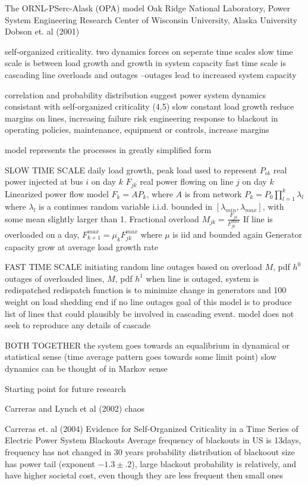 The ORNL-PSerc-Alask (OPA) model    
Oak Ridge National Laboratory, Power System Engineering Research Center of Wisconsin University, Alaska University
Dobson et. al (2001) \cite{dobson_2001}

self-organized criticality.  two dynamics forces on seperate time scales
slow time scale is between load growth and growth in system capacity
fast time scale is cascading line overloads and outages
--outages lead to increased system capacity

correlation and probability distribution suggest power system dynamics consistant with self-organized criticality (4,5)
slow constant load growth reduce margins on lines, increasing failure risk
engineering response to blackout in operating policies, maintenance, equipment or controls, increase margins

model represents the processes in greatly simplified form

SLOW TIME SCALE
daily load growth, peak load used to represent
$P_{ik}$ real power injected at bus $i$ on day $k$
$F_{jk} $ real power flowing on line $j$ on day $k$
Linearized power flow model
$F_k = A P_k$, where $A$ is from network 
$P_k = P_0 \prod_{l=1}^k \lambda_l $ where $\lambda_l $ is a continues random variable i.i.d. bounded in $[\lambda_{min},\lambda_{max}]$, with some mean slightly larger than 1.
Fractional overload $M_{jk} = \frac{F_{jk}}{F_{jk}^{max}}$
If line is overloaded on a day, $F_{k+1}^{max} = \mu_k F_{jk}^{max}$ where $\mu$ is iid and bounded again
Generator capacity grow at average load growth rate

FAST TIME SCALE
initiating random line outages based on overload $M$, pdf $h^0$
outages of overloaded lines, $M$, pdf $h^1$
when line is outaged, system is redispatched
redispatch function is to minimize change in generators and 100 weight on load shedding
end if no line outages
goal of this model is to produce list of lines that could plausibly be involved in cascading event.
model does not seek to reproduce any details of cascade

BOTH TOGETHER
the system goes towards an equalibrium in dynamical or statistical sense  (time average pattern goes towards some limit point)
slow dynamics can be thought of in Markov sense

Starting point for future research

Carreras and Lynch et al (2002) \cite{carreras_2002}
chaos

Carreras et. al (2004)  Evidence for Self-Organized Criticality in a Time Series of Electric Power System Blackouts \cite{carreras_2004}
Average frequency of blackouts in US is 13days, frequency has not changed in 30 years
probability distribution of blackoout size has power tail (exponent $-1.3 \pm .2$), large blackout probability is relatively, and have higher societal cost, even though they are less frequent then small ones

